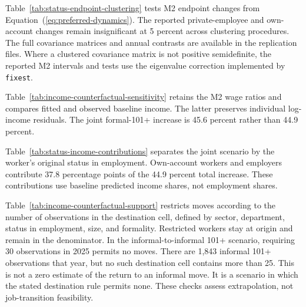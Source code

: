Table~\ref{tab:status-endpoint-clustering} tests M2 endpoint changes from
Equation~(\ref{eq:preferred-dynamics}). The reported private-employee and
own-account changes remain insignificant at 5 percent across
clustering procedures. The full covariance matrices and annual contrasts
are available in the replication files. Where a clustered covariance matrix
is not positive semidefinite, the reported M2 intervals and tests use the
eigenvalue correction implemented by \texttt{fixest}.

\FloatBarrier



\FloatBarrier
Table~\ref{tab:income-counterfactual-sensitivity} retains the M2 wage ratios
and compares fitted and observed baseline income. The latter preserves
individual log-income residuals. The joint formal-101+ increase is
45.6 percent rather than 44.9 percent.


Table~\ref{tab:status-income-contributions} separates the joint scenario by
the worker's original status in employment. Own-account workers and employers
contribute 37.8 percentage points of the 44.9 percent total increase.
These contributions use baseline predicted income shares, not employment
shares.


Table~\ref{tab:income-counterfactual-support} restricts moves according to
the number of observations in the destination cell, defined by sector,
department, status in employment, size, and formality. Restricted workers
stay at origin and remain in the denominator. In the informal-to-informal
101+ scenario, requiring 30 observations in 2025 permits no moves.
There are 1,843 informal 101+ observations that year, but no such
destination cell contains more than 25. This is not a zero estimate of
the return to an informal move. It is a scenario in which the stated
destination rule permits none. These checks assess extrapolation, not
job-transition feasibility.

\FloatBarrier
